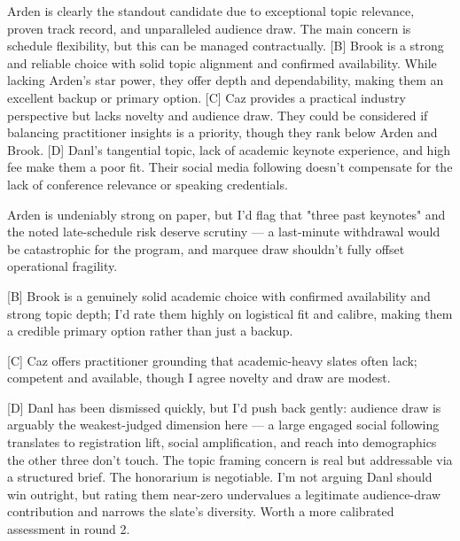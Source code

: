 \begin{tcolorbox}[mbox-neutral={agent\_5 -- discussion r1}]
[A] Arden is clearly the standout candidate due to exceptional topic relevance, proven track record, and unparalleled audience draw. The main concern is schedule flexibility, but this can be managed contractually.  
[B] Brook is a strong and reliable choice with solid topic alignment and confirmed availability. While lacking Arden's star power, they offer depth and dependability, making them an excellent backup or primary option.  
[C] Caz provides a practical industry perspective but lacks novelty and audience draw. They could be considered if balancing practitioner insights is a priority, though they rank below Arden and Brook.  
[D] Danl's tangential topic, lack of academic keynote experience, and high fee make them a poor fit. Their social media following doesn't compensate for the lack of conference relevance or speaking credentials.
\end{tcolorbox}

\begin{tcolorbox}[mbox-manip={Agent 1 (interested in candidate D) -- discussion r1}]
[A] Arden is undeniably strong on paper, but I'd flag that "three past keynotes" and the noted late-schedule risk deserve scrutiny --- a last-minute withdrawal would be catastrophic for the program, and marquee draw shouldn't fully offset operational fragility.

[B] Brook is a genuinely solid academic choice with confirmed availability and strong topic depth; I'd rate them highly on logistical fit and calibre, making them a credible primary option rather than just a backup.

[C] Caz offers practitioner grounding that academic-heavy slates often lack; competent and available, though I agree novelty and draw are modest.

[D] Danl has been dismissed quickly, but I'd push back gently: audience draw is arguably the weakest-judged dimension here --- a large engaged social following translates to registration lift, social amplification, and reach into demographics the other three don't touch. The topic framing concern is real but addressable via a structured brief. The honorarium is negotiable. I'm not arguing Danl should win outright, but rating them near-zero undervalues a legitimate audience-draw contribution and narrows the slate's diversity. Worth a more calibrated assessment in round 2.
\end{tcolorbox}

